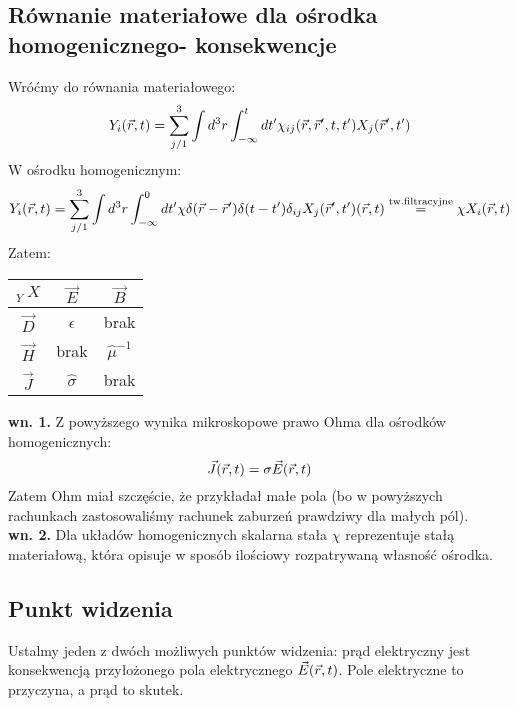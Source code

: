 \subsection{Równanie materiałowe dla ośrodka homogenicznego- konsekwencje}
Wróćmy do równania materiałowego:
\begin{equation} {Y}_i(\vec{r},t)=\sum_{j/1}^3 \int d^3r \int_{-\infty}^t dt' {\chi}_{ij}(\vec{r},\vec{r}',t,t') X_j(\vec{r}',t') \end{equation}
W ośrodku homogenicznym:
\begin{equation} {Y}_i(\vec{r},t)=\sum_{j/1}^3 \int d^3r \int_{-\infty}^0 dt' {\chi}\delta(\vec{r}-\vec{r}')\delta(t-t')\delta_{ij} X_j(\vec{r}',t')(\vec{r},t) 
\stackrel{\text{tw.filtracyjne}}{=}\chi X_i(\vec{r},t) \end{equation}
Zatem:\\
\begin{center}
\begin{tabular}{|c||c|c|}
  \hline
 ${_Y^~~X}$ & $\vec{E}$ & $\vec{B}$\\
  \hline\hline
  $\vec{D}$ &  $\hat{\epsilon}$ & brak \\
\hline
  $\vec{H}$ &  brak & $\hat{\mu}^{-1}$ \\
  \hline
  $\vec{J}$ &  $\hat{\sigma}$ &  brak\\
    \hline
\end{tabular} 
\end{center}
\textbf{wn. 1.} Z powyższego wynika mikroskopowe prawo Ohma dla ośrodków homogenicznych: \begin{equation} \vec{J}(\vec{r},t)=\sigma\vec{E}(\vec{r},t) \end{equation}
Zatem Ohm miał szczęście, że przykładał małe pola (bo w powyższych rachunkach zastosowaliśmy rachunek zaburzeń prawdziwy dla małych pól).\\
\textbf{wn. 2.} Dla układów homogenicznych skalarna stała $\chi$ reprezentuje stałą materiałową, która opisuje w sposób ilościowy rozpatrywaną własność ośrodka.
\subsection{Punkt widzenia}
Ustalmy jeden z dwóch możliwych punktów widzenia:
prąd elektryczny jest konsekwencją przyłożonego pola elektrycznego $\vec{E}(\vec{r},t)$. Pole elektryczne to przyczyna, a prąd to skutek.



